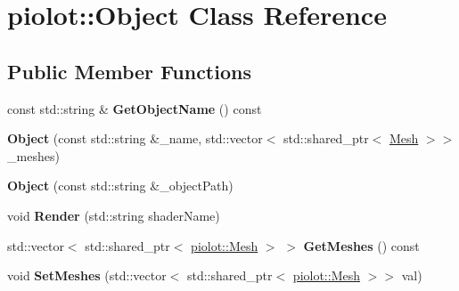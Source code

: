 \hypertarget{classpiolot_1_1_object}{}\section{piolot\+:\+:Object Class Reference}
\label{classpiolot_1_1_object}
\subsection*{Public Member Functions}
\begin{DoxyCompactItemize}
\item 
\mbox{\label{classpiolot_1_1_object_a592cb508bd914b41bff868e2a9b648f5}} 
const std\+::string \& {\bfseries Get\+Object\+Name} () const
\item 
\mbox{\label{classpiolot_1_1_object_a05e280baf87f9780e5de1c24849b862c}} 
{\bfseries Object} (const std\+::string \&\+\_\+name, std\+::vector$<$ std\+::shared\+\_\+ptr$<$ \mbox{\hyperlink{classpiolot_1_1_mesh}{Mesh}} $>$$>$ \+\_\+meshes)
\item 
\mbox{\label{classpiolot_1_1_object_add3cd7bb280395a43069e872b384ac97}} 
{\bfseries Object} (const std\+::string \&\+\_\+object\+Path)
\item 
\mbox{\label{classpiolot_1_1_object_aac452c0e8843e6a1bc64b4e7eae031cf}} 
void {\bfseries Render} (std\+::string shader\+Name)
\item 
\mbox{\label{classpiolot_1_1_object_ab3126fb80869e1a5b02ef43eb27e69ce}} 
std\+::vector$<$ std\+::shared\+\_\+ptr$<$ \mbox{\hyperlink{classpiolot_1_1_mesh}{piolot\+::\+Mesh}} $>$ $>$ {\bfseries Get\+Meshes} () const
\item 
\mbox{\label{classpiolot_1_1_object_abe2585d95f1cb2b388ea3bdf7868b968}} 
void {\bfseries Set\+Meshes} (std\+::vector$<$ std\+::shared\+\_\+ptr$<$ \mbox{\hyperlink{classpiolot_1_1_mesh}{piolot\+::\+Mesh}} $>$$>$ val)
\end{DoxyCompactItemize}

